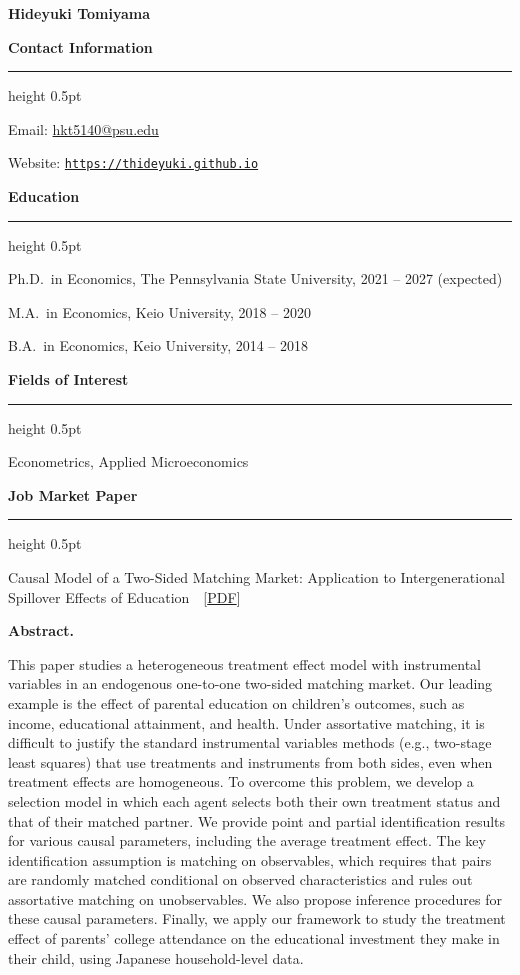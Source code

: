 \documentclass[10pt,letterpaper]{article}
\newcommand{\cvsection}[1]{%
  \vspace{1.05em}%
  {\fontsize{11.5}{14}\selectfont\bfseries #1}\par
  \vspace{3pt}%
  \hrule height 0.5pt
  \vspace{0.62em}%
}
\newenvironment{cvlist}{%
  \begin{list}{}{%
    \setlength{\leftmargin}{1.7em}%
    \setlength{\labelwidth}{0pt}%
    \setlength{\labelsep}{0pt}%
    \setlength{\itemsep}{0.50em}%
    \setlength{\parsep}{0pt}%
    \setlength{\topsep}{0pt}%
    \setlength{\partopsep}{0pt}%
  }%
}{\end{list}}
\newenvironment{cvlisttight}{%
  \begin{list}{}{%
    \setlength{\leftmargin}{1.7em}%
    \setlength{\labelwidth}{0pt}%
    \setlength{\labelsep}{0pt}%
    \setlength{\itemsep}{0.32em}%
    \setlength{\parsep}{0pt}%
    \setlength{\topsep}{0pt}%
    \setlength{\partopsep}{0pt}%
  }%
}{\end{list}}
\newcommand{\entry}{\item[]}
\newenvironment{abstractblock}{%
  \begingroup
  \fontsize{8.6}{11.3}\selectfont
  \begin{list}{}{%
    \setlength{\leftmargin}{0.9em}%
    \setlength{\rightmargin}{0.4em}%
    \setlength{\topsep}{0.15em}%
    \setlength{\parsep}{0pt}%
    \setlength{\itemsep}{0pt}%
  }\item[]\textbf{Abstract.}\ %
}{\end{list}\endgroup}
\begin{document}
\begin{center}
{\LARGE\bfseries Hideyuki Tomiyama}
\end{center}
\vspace{0.6em}

\cvsection{Contact Information}
\begin{cvlisttight}
\entry Email: \href{mailto:hkt5140@psu.edu}{hkt5140@psu.edu}
\entry Website: \href{https://thideyuki.github.io}{\texttt{https://thideyuki.github.io}}
\end{cvlisttight}

\cvsection{Education}
\begin{cvlist}
\entry Ph.D.\ in Economics, The Pennsylvania State University, 2021 -- 2027 (expected)
\entry M.A.\ in Economics, Keio University, 2018 -- 2020
\entry B.A.\ in Economics, Keio University, 2014 -- 2018
\end{cvlist}

\cvsection{Fields of Interest}
\begin{cvlisttight}
\entry Econometrics, Applied Microeconomics
\end{cvlisttight}

\cvsection{Job Market Paper}
\begin{cvlist}
\entry Causal Model of a Two-Sided Matching Market: Application to Intergenerational
       Spillover Effects of Education\ \ [\href{https://thideyuki.netlify.app/Matching_treatment.pdf}{PDF}]
\item[]\vspace{-0.15em}
\begin{abstractblock}
This paper studies a heterogeneous treatment effect model with instrumental variables in an endogenous one-to-one two-sided matching market. Our leading example is the effect of parental education on children's outcomes, such as income, educational attainment, and health. Under assortative matching, it is difficult to justify the standard instrumental variables methods (e.g., two-stage least squares) that use treatments and instruments from both sides, even when treatment effects are homogeneous. To overcome this problem, we develop a selection model in which each agent selects both their own treatment status and that of their matched partner. We provide point and partial identification results for various causal parameters, including the average treatment effect. The key identification assumption is matching on observables, which requires that pairs are randomly matched conditional on observed characteristics and rules out assortative matching on unobservables. We also propose inference procedures for these causal parameters. Finally, we apply our framework to study the treatment effect of parents' college attendance on the educational investment they make in their child, using Japanese household-level data.
\end{abstractblock}
\end{cvlist}
\end{document}
